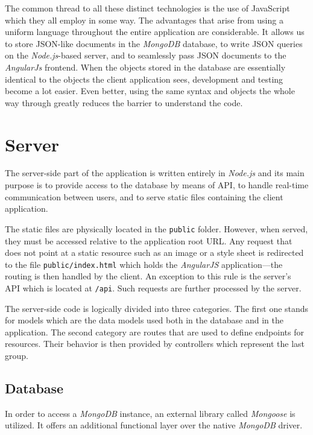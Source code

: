 \documentclass[thesis=M,english,hidelinks]{FITthesis}[2012/10/20]
\newcommand{\code}{\texttt}
\begin{document}
The common thread to all these distinct technologies is the use of JavaScript which they all employ in some way. The advantages that arise from using a uniform language throughout the entire application are considerable. It allows us to store JSON-like documents in the \textit{MongoDB} database, to write JSON queries on the \textit{Node.js}-based server, and to seamlessly pass JSON documents to the \textit{AngularJs} frontend. When the objects stored in the database are essentially identical to the objects the client application sees, development and testing become a lot easier. Even better, using the same syntax and objects the whole way through greatly reduces the barrier to understand the code.

  \section{Server}

The server-side part of the application is written entirely in \textit{Node.js} and its main purpose is to provide access to the database by means of API, to handle real-time communication between users, and to serve static files containing the client application.

The static files are physically located in the \code{public} folder. However, when served, they must be accessed relative to the application root URL. Any request that does not point at a static resource such as an image or a style sheet is redirected to the file \code{public/index.html} which holds the \textit{AngularJS} application---the routing is then handled by the client. An exception to this rule is the server's API which is located at \code{/api}. Such requests are further processed by the server.

The server-side code is logically divided into three categories. The first one stands for models which are the data models used both in the database and in the application. The second category are routes that are used to define endpoints for resources. Their behavior is then provided by controllers which represent the last group.

    \subsection{Database}

In order to access a \textit{MongoDB} instance, an external library called \textit{Mongoose} \cite{mongoose} is utilized. It offers an additional functional layer over the native \textit{MongoDB} driver.
\end{document}
